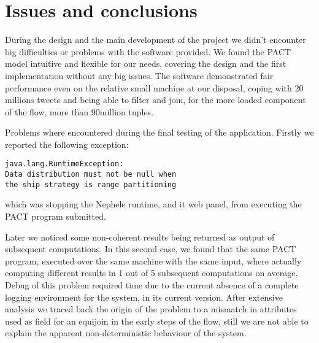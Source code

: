 \section{Issues and conclusions}
\label{sec:issues}

During the design and the main development of the project we didn't encounter big difficulties or problems with the software provided.
We found the PACT model intuitive and flexible for our needs, covering the design and the first implementation without any big issues.
The software demonstrated fair performance even on the relative small machine at our disposal, coping with 20 millions tweets and being able to filter and join, for the more loaded component of the flow, more than 90million tuples.

Problems where encountered during the final testing of the application.
Firstly we reported the following exception:
\begin{verbatim}
java.lang.RuntimeException: 
Data distribution must not be null when 
the ship strategy is range partitioning
\end{verbatim}
which was stopping the Nephele runtime, and it web panel, from executing the PACT program submitted.

Later we noticed some non-coherent results being returned as output of subsequent computations.
In this second case, we found that the same PACT program, executed over the same machine with the same input, where actually computing different results in 1 out of 5 subsequent computations on average.
Debug of this problem required time due to the current absence of a complete logging environment for the system, in its current version.
After extensive analysis we traced back the origin of the problem to a mismatch in attributes used as field for an equijoin in the early steps of the flow, still we are not able to explain the apparent non-deterministic behaviour of the system. 

